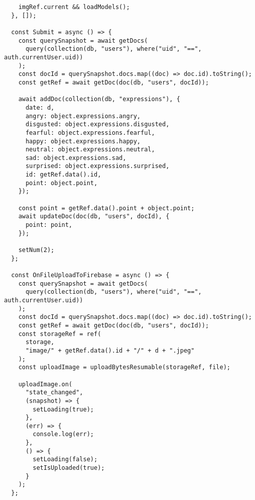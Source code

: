 \begin{verbatim}
    imgRef.current && loadModels();
  }, []);

  const Submit = async () => {
    const querySnapshot = await getDocs(
      query(collection(db, "users"), where("uid", "==", auth.currentUser.uid))
    );
    const docId = querySnapshot.docs.map((doc) => doc.id).toString();
    const getRef = await getDoc(doc(db, "users", docId));

    await addDoc(collection(db, "expressions"), {
      date: d,
      angry: object.expressions.angry,
      disgusted: object.expressions.disgusted,
      fearful: object.expressions.fearful,
      happy: object.expressions.happy,
      neutral: object.expressions.neutral,
      sad: object.expressions.sad,
      surprised: object.expressions.surprised,
      id: getRef.data().id,
      point: object.point,
    });

    const point = getRef.data().point + object.point;
    await updateDoc(doc(db, "users", docId), {
      point: point,
    });

    setNum(2);
  };

  const OnFileUploadToFirebase = async () => {
    const querySnapshot = await getDocs(
      query(collection(db, "users"), where("uid", "==", auth.currentUser.uid))
    );
    const docId = querySnapshot.docs.map((doc) => doc.id).toString();
    const getRef = await getDoc(doc(db, "users", docId));
    const storageRef = ref(
      storage,
      "image/" + getRef.data().id + "/" + d + ".jpeg"
    );
    const uploadImage = uploadBytesResumable(storageRef, file);

    uploadImage.on(
      "state_changed",
      (snapshot) => {
        setLoading(true);
      },
      (err) => {
        console.log(err);
      },
      () => {
        setLoading(false);
        setIsUploaded(true);
      }
    );
  };


\end{verbatim}
